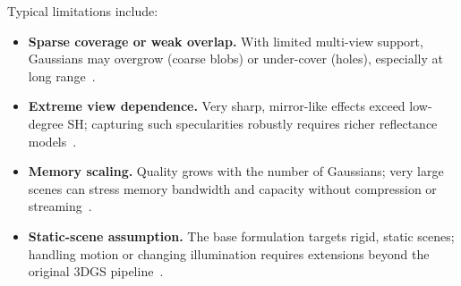 \begin{enrichment}
\begin{enrichment}
\begin{enrichment}
        \noindent Typical limitations include:
        \begin{itemize}
            \item \textbf{Sparse coverage or weak overlap.} With limited multi-view support, Gaussians may overgrow (coarse blobs) or under-cover (holes), especially at long range~\cite{kerbl2023_3dgaussiansplatting,barron2022_mipnerf360}.
            \item \textbf{Extreme view dependence.} Very sharp, mirror-like effects exceed low-degree SH; capturing such specularities robustly requires richer reflectance models~\cite{kerbl2023_3dgaussiansplatting}.
            \item \textbf{Memory scaling.} Quality grows with the number of Gaussians; very large scenes can stress memory bandwidth and capacity without compression or streaming~\cite{kerbl2023_3dgaussiansplatting}.
            \item \textbf{Static-scene assumption.} The base formulation targets rigid, static scenes; handling motion or changing illumination requires extensions beyond the original 3DGS pipeline~\cite{kerbl2023_3dgaussiansplatting}.
        \end{itemize}
        
        \newpage
        

\end{enrichment}
\end{enrichment}
\end{enrichment}
